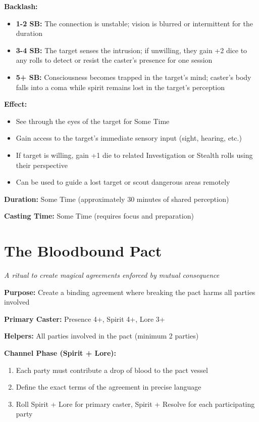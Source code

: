 \textbf{Backlash:}
\begin{itemize}
\item \textbf{1-2 SB:} The connection is unstable; vision is blurred or intermittent for the duration
\item \textbf{3-4 SB:} The target senses the intrusion; if unwilling, they gain +2 dice to any rolls to detect or resist the caster's presence for one session
\item \textbf{5+ SB:} Consciousness becomes trapped in the target's mind; caster's body falls into a coma while spirit remains lost in the target's perception
\end{itemize}

\textbf{Effect:}
\begin{itemize}
\item See through the eyes of the target for Some Time
\item Gain access to the target's immediate sensory input (sight, hearing, etc.)
\item If target is willing, gain +1 die to related Investigation or Stealth rolls using their perspective
\item Can be used to guide a lost target or scout dangerous areas remotely
\end{itemize}

\textbf{Duration:} Some Time (approximately 30 minutes of shared perception)

\textbf{Casting Time:} Some Time (requires focus and preparation)

\section*{The Bloodbound Pact}
\textit{A ritual to create magical agreements enforced by mutual consequence}

\textbf{Purpose:} Create a binding agreement where breaking the pact harms all parties involved

\textbf{Primary Caster:} Presence 4+, Spirit 4+, Lore 3+

\textbf{Helpers:} All parties involved in the pact (minimum 2 parties)

\textbf{Channel Phase (Spirit + Lore):}
\begin{enumerate}
\item Each party must contribute a drop of blood to the pact vessel
\item Define the exact terms of the agreement in precise language
\item Roll Spirit + Lore for primary caster, Spirit + Resolve for each participating party
\end{enumerate}

